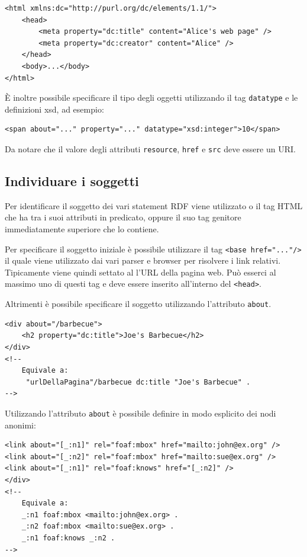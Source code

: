 \begin{lstlisting}[language=RDFA, caption=La pagina web creata da Alice]
<html xmlns:dc="http://purl.org/dc/elements/1.1/"> 
	<head>
		<meta property="dc:title" content="Alice's web page" />
		<meta property="dc:creator" content="Alice" />
	</head>
	<body>...</body>
</html>
\end{lstlisting}

\`E inoltre possibile specificare il tipo degli oggetti utilizzando il tag \texttt{datatype} e le definizioni xsd, ad esempio:

\begin{lstlisting}[language=RDFA]
	<span about="..." property="..." datatype="xsd:integer">10</span>
\end{lstlisting}

Da notare che il valore degli attributi \texttt{resource}, \texttt{href} e \texttt{src} deve essere un URI.

\subsection{Individuare i soggetti}

Per identificare il soggetto dei vari statement RDF viene utilizzato o il tag HTML che ha tra i suoi attributi in predicato, oppure il suo tag genitore immediatamente superiore che lo contiene.

Per specificare il soggetto iniziale è possibile utilizzare il tag \texttt{<base href="..."/>} il quale viene utilizzato dai vari parser e browser per risolvere i link relativi. Tipicamente viene quindi settato al l'URL della pagina web.
Può esserci al massimo uno di questi tag e deve essere inserito all'interno del \texttt{<head>}.

Altrimenti è possibile specificare il soggetto utilizzando l'attributo \texttt{about}.

\begin{lstlisting}[language=RDFA, caption=Utilizzo di about]
<div about="/barbecue">
	<h2 property="dc:title">Joe's Barbecue</h2>
</div>
<!--
	Equivale a:
	 "urlDellaPagina"/barbecue dc:title "Joe's Barbecue" .
-->
\end{lstlisting}

Utilizzando l'attributo \texttt{about} è possibile definire in modo esplicito dei nodi anonimi:

\begin{lstlisting}[language=RDFA, caption=Utilizzo di about]
<link about="[_:n1]" rel="foaf:mbox" href="mailto:john@ex.org" />
<link about="[_:n2]" rel="foaf:mbox" href="mailto:sue@ex.org" />
<link about="[_:n1]" rel="foaf:knows" href="[_:n2]" />
</div>
<!--
	Equivale a:
	_:n1 foaf:mbox <mailto:john@ex.org> .
	_:n2 foaf:mbox <mailto:sue@ex.org> .
	_:n1 foaf:knows _:n2 .
-->
\end{lstlisting}

